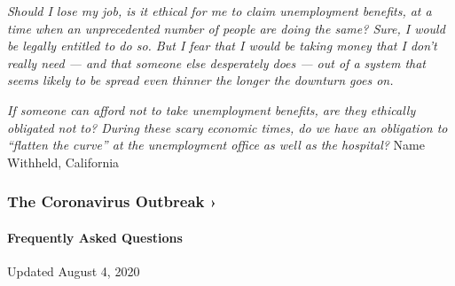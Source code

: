 \emph{Should I lose my job, is it ethical for me to claim unemployment
benefits, at a time when an unprecedented number of people are doing the
same? Sure, I would be legally entitled to do so. But I fear that I
would be taking money that I don't really need --- and that someone else
desperately does --- out of a system that seems likely to be spread even
thinner the longer the downturn goes on.}

\emph{If someone can afford not to take unemployment benefits, are they
ethically obligated not to? During these scary economic times, do we
have an obligation to ``flatten the curve'' at the unemployment office
as well as the hospital?} Name Withheld, California

\href{https://www.nytimes3xbfgragh.onion/news-event/coronavirus?action=click\&pgtype=Article\&state=default\&region=MAIN_CONTENT_3\&context=storylines_faq}{}

\hypertarget{the-coronavirus-outbreak-}{%
\subsubsection{The Coronavirus Outbreak
›}\label{the-coronavirus-outbreak-}}

\hypertarget{frequently-asked-questions}{%
\paragraph{Frequently Asked
Questions}\label{frequently-asked-questions}}

Updated August 4, 2020

